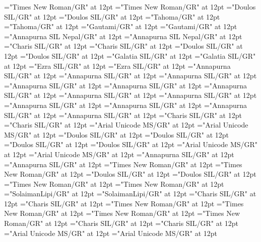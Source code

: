 \documentclass[a4paper]{article}
\begin{document}
\font\divfr="Times New Roman/GR" at 12pt
\font\spanfr="Times New Roman/GR" at 12pt
\font\divgas="Doulos SIL/GR" at 12pt
\font\spangas="Doulos SIL/GR" at 12pt
\font\divggofonipaxemic="Tahoma/GR" at 12pt
\font\spanggofonipaxemic="Tahoma/GR" at 12pt
\font\divggoTeluIN="Gautami/GR" at 12pt
\font\spanggoTeluIN="Gautami/GR" at 12pt
\font\divgheDeva="Annapurna SIL Nepal/GR" at 12pt
\font\spangheDeva="Annapurna SIL Nepal/GR" at 12pt
\font\divgheQaaaxZipa="Charis SIL/GR" at 12pt
\font\spangheQaaaxZipa="Charis SIL/GR" at 12pt
\font\divgrcfonipa="Doulos SIL/GR" at 12pt
\font\spangrcfonipa="Doulos SIL/GR" at 12pt
\font\divgrc="Galatia SIL/GR" at 12pt
\font\spangrc="Galatia SIL/GR" at 12pt
\font\divhbo="Ezra SIL/GR" at 12pt
\font\spanhbo="Ezra SIL/GR" at 12pt
\font\divhiDeva="Annapurna SIL/GR" at 12pt
\font\spanhiDeva="Annapurna SIL/GR" at 12pt
\font\divhiDsrt="Annapurna SIL/GR" at 12pt
\font\spanhiDsrt="Annapurna SIL/GR" at 12pt
\font\divhifonipaxetic="Annapurna SIL/GR" at 12pt
\font\spanhifonipaxetic="Annapurna SIL/GR" at 12pt
\font\divhifonipa="Annapurna SIL/GR" at 12pt
\font\spanhifonipa="Annapurna SIL/GR" at 12pt
\font\divhixudaipur="Annapurna SIL/GR" at 12pt
\font\spanhixudaipur="Annapurna SIL/GR" at 12pt
\font\divhi="Annapurna SIL/GR" at 12pt
\font\spanhi="Annapurna SIL/GR" at 12pt
\font\divhlbfonipa="Charis SIL/GR" at 12pt
\font\spanhlbfonipa="Charis SIL/GR" at 12pt
\font\divhlb="Arial Unicode MS/GR" at 12pt
\font\spanhlb="Arial Unicode MS/GR" at 12pt
\font\divhojfonipaxetic="Doulos SIL/GR" at 12pt
\font\spanhojfonipaxetic="Doulos SIL/GR" at 12pt
\font\divhojfonipa="Doulos SIL/GR" at 12pt
\font\spanhojfonipa="Doulos SIL/GR" at 12pt
\font\divhojZxxxxaudio="Arial Unicode MS/GR" at 12pt
\font\spanhojZxxxxaudio="Arial Unicode MS/GR" at 12pt
\font\divhoj="Annapurna SIL/GR" at 12pt
\font\spanhoj="Annapurna SIL/GR" at 12pt
\font\divid="Times New Roman/GR" at 12pt
\font\spanid="Times New Roman/GR" at 12pt
\font\divirufonipa="Doulos SIL/GR" at 12pt
\font\spanirufonipa="Doulos SIL/GR" at 12pt
\font\diviru="Times New Roman/GR" at 12pt
\font\spaniru="Times New Roman/GR" at 12pt
\font\divkdqBengIN="SolaimanLipi/GR" at 12pt
\font\spankdqBengIN="SolaimanLipi/GR" at 12pt
\font\divkdqfonipa="Charis SIL/GR" at 12pt
\font\spankdqfonipa="Charis SIL/GR" at 12pt
\font\divkdqLatnIN="Times New Roman/GR" at 12pt
\font\spankdqLatnIN="Times New Roman/GR" at 12pt
\font\divkdq="Times New Roman/GR" at 12pt
\font\spankdq="Times New Roman/GR" at 12pt
\font\divkfafonipa="Charis SIL/GR" at 12pt
\font\spankfafonipa="Charis SIL/GR" at 12pt
\font\divkfaKndaxKAR="Arial Unicode MS/GR" at 12pt
\font\spankfaKndaxKAR="Arial Unicode MS/GR" at 12pt
\end{document}
